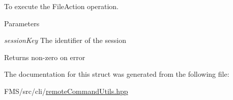 To execute the FileAction operation. 


\begin{DoxyParams}{Parameters}
\item[{\em sessionKey}]The identifier of the session \end{DoxyParams}
\begin{DoxyReturn}{Returns}
non-\/zero on error 
\end{DoxyReturn}


The documentation for this struct was generated from the following file:\begin{DoxyCompactItemize}
\item 
FMS/src/cli/\hyperlink{remoteCommandUtils_8hpp}{remoteCommandUtils.hpp}\end{DoxyCompactItemize}
